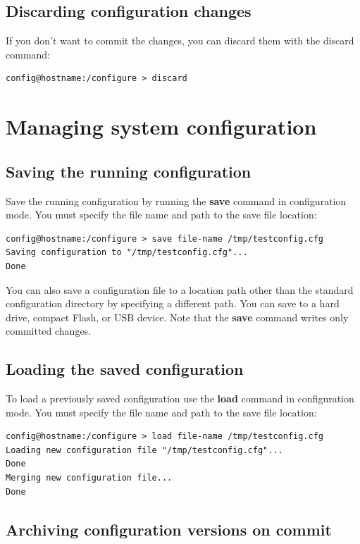 \documentclass[a4paper,latin]{paper}
\begin{document}
\subsection{Discarding configuration changes}

If you don’t want to commit the changes, you can discard them with the discard command:
\begin{lstlisting}[style=BashInputStyle]
config@hostname:/configure > discard
\end{lstlisting}

\section{Managing system configuration}

\subsection{Saving the running configuration}
Save the running configuration by running the \textbf{save} command in configuration mode. You
must specify the file name and path to the save file location:
\begin{lstlisting}[style=BashInputStyle]
config@hostname:/configure > save file-name /tmp/testconfig.cfg
Saving configuration to "/tmp/testconfig.cfg"...
Done
\end{lstlisting}
You can also save a configuration file to a location path other than the standard
configuration directory by specifying a different path. You can save to a hard drive, compact
Flash, or USB device. Note that the \textbf{save} command writes only committed changes.

\subsection{Loading the saved configuration}

To load a previously saved configuration use the \textbf{load} command in configuration mode. You
must specify the file name and path to the save file location:
\begin{lstlisting}[style=BashInputStyle]
config@hostname:/configure > load file-name /tmp/testconfig.cfg
Loading new configuration file "/tmp/testconfig.cfg"...
Done
Merging new configuration file...
Done
\end{lstlisting}

\subsection{Archiving configuration versions on commit}
\end{document}
